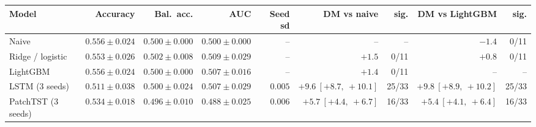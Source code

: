 \begin{tabular}{lrrrrrrrr}
\toprule
Model & Accuracy & Bal.\ acc. & AUC & Seed sd & DM vs naive & sig. & DM vs LightGBM & sig. \\
\midrule
Naive & $0.556 \pm 0.024$ & $0.500 \pm 0.000$ & $0.500 \pm 0.000$ & -- & -- & -- & $-1.4$ & 0/11 \\
Ridge / logistic & $0.553 \pm 0.026$ & $0.502 \pm 0.008$ & $0.509 \pm 0.029$ & -- & $+1.5$ & 0/11 & $+0.8$ & 0/11 \\
LightGBM & $0.556 \pm 0.024$ & $0.500 \pm 0.000$ & $0.507 \pm 0.016$ & -- & $+1.4$ & 0/11 & -- & -- \\
LSTM (3 seeds) & $0.511 \pm 0.038$ & $0.500 \pm 0.024$ & $0.507 \pm 0.029$ & $0.005$ & $+9.6\ [+8.7,\ +10.1]$ & 25/33 & $+9.8\ [+8.9,\ +10.2]$ & 25/33 \\
PatchTST (3 seeds) & $0.534 \pm 0.018$ & $0.496 \pm 0.010$ & $0.488 \pm 0.025$ & $0.006$ & $+5.7\ [+4.4,\ +6.7]$ & 16/33 & $+5.4\ [+4.1,\ +6.4]$ & 16/33 \\
\bottomrule
\end{tabular}
